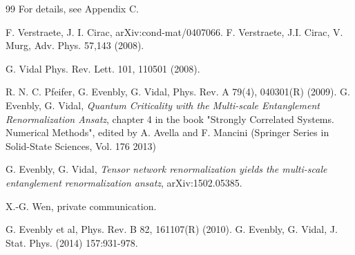 \documentclass[aps,prl,twocolumn,showpacs,superscriptaddress,floatfix,10pt]{revtex4-1}
\newcommand{\bk}[1]{\mbox{$\langle #1 \rangle$}}
\begin{document}
\begin{thebibliography}{99}
 For details, see Appendix C.


F. Verstraete, J. I. Cirac,
arXiv:cond-mat/0407066.
%
F. Verstraete, J.I. Cirac, V. Murg,
Adv. Phys. 57,143 (2008).

G. Vidal
Phys. Rev. Lett. 101, 110501 (2008).

R. N. C. Pfeifer, G. Evenbly, G. Vidal,
Phys. Rev. A 79(4), 040301(R) (2009).
G. Evenbly, G. Vidal, \textit{Quantum Criticality with the Multi-scale Entanglement Renormalization Ansatz}, chapter 4 in the book "Strongly Correlated Systems. Numerical Methods", edited by A. Avella and F. Mancini (Springer Series in Solid-State Sciences, Vol. 176 2013)

%

G. Evenbly, G. Vidal, \textit{Tensor network renormalization yields the multi-scale entanglement renormalization ansatz}, arXiv:1502.05385.

 X.-G. Wen, private communication.

G. Evenbly et al, Phys. Rev. B 82, 161107(R) (2010).
G. Evenbly, G. Vidal, J. Stat. Phys. (2014) 157:931-978.


\end{thebibliography}
\end{document}
